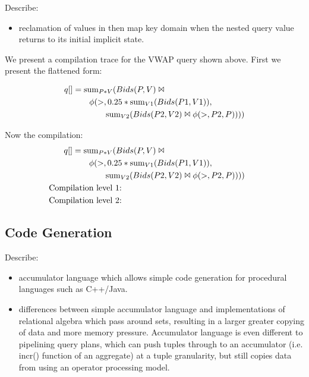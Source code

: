 Describe:
\begin{itemize}
\item reclamation of values in then map key domain when the nested
  query value returns to its initial implicit state.
\end{itemize}

We present a compilation trace for the VWAP query shown above. First we present
the flattened form:

\begin{align*}
q[] & = \mathrm{sum}_{P*V}( Bids(P,V) \Join \\
& \qquad \phi(>, 0.25*\mathrm{sum}_{V1}(Bids(P1,V1)), \\
&  \qquad \qquad \mathrm{sum}_{V2}(Bids(P2,V2) \Join \phi(>,P2,P))))\\
\end{align*}

Now the compilation:
\begin{align*}
q[] & = \algsum_{P*V}( Bids(P,V) \Join \\
& \qquad \phi(>, 0.25*\algsum_{V1}(Bids(P1,V1)), \\
&  \qquad \qquad \algsum_{V2}(Bids(P2,V2) \Join \phi(>,P2,P))))\\
& \hspace{-1cm}\mbox{Compilation level 1:}\\
& \hspace{-1cm}\mbox{Compilation level 2:}\\
\end{align*}

\subsection{Code Generation}
Describe:
\begin{itemize}
\item accumulator language which allows simple code generation for
procedural languages such as C++/Java.
\item differences between simple accumulator language and implementations of
relational algebra which pass around sets, resulting in a larger greater copying
of data and more memory pressure. Accumulator language is even different to
pipelining query plans, which can push tuples through to an accumulator
(i.e. incr() function of an aggregate) at a tuple granularity, but still copies
data from using an operator processing model.
\end{itemize}
